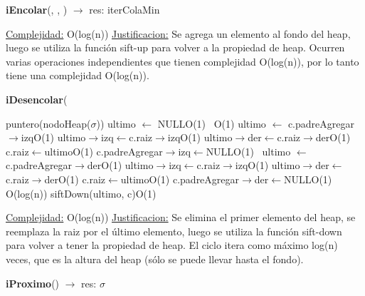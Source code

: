 \begin{Representacion}
\begin{Algoritmos}
\begin{algorithm}[H]{\textbf{iEncolar}(, , ) $\to$ res: iterColaMin}
\begin{algorithmic}[1]
		
		\medskip
		\Statex \underline{Complejidad:} O(log(n))
			\Statex \underline{Justificacion:} Se agrega un elemento al fondo del heap, luego se utiliza la función sift-up para volver a la propiedad de heap. Ocurren varias operaciones independientes que tienen complejidad O(log(n)), por lo tanto tiene una complejidad O(log(n)).
	\end{algorithmic}
\end{algorithm}



\begin{algorithm}[H]{\textbf{iDesencolar}(}
	\begin{algorithmic}[1]

		\State puntero(nodoHeap($\sigma$)) ultimo $\leftarrow$ NULL\Comment O(1)
		\,
		\Comment O(1)
			\State ultimo $\leftarrow$ c.padreAgregar$\rightarrow$izq\Comment O(1)
			\State ultimo$\rightarrow$izq$\leftarrow$c.raiz$\rightarrow$izq\Comment O(1)
			\State ultimo$\rightarrow$der$\leftarrow$c.raiz$\rightarrow$der\Comment O(1)
			\State c.raiz$\leftarrow$ultimo\Comment O(1)
			\State c.padreAgregar$\rightarrow$izq$\leftarrow$NULL\Comment O(1)
			\,
		\Else
			\State ultimo $\leftarrow$ c.padreAgregar$\rightarrow$der\Comment O(1)
			\State ultimo$\rightarrow$izq$\leftarrow$c.raiz$\rightarrow$izq\Comment O(1)
			\State ultimo$\rightarrow$der$\leftarrow$c.raiz$\rightarrow$der\Comment O(1)
			\State c.raiz$\leftarrow$ultimo\Comment O(1)
			\State c.padreAgregar$\rightarrow$der$\leftarrow$NULL\Comment O(1)
		\EndIf
		\,
		 \Comment O(log(n))
			\State siftDown(ultimo, c)\Comment O(1)
		\EndWhile
		
		\medskip
		\Statex \underline{Complejidad:} O(log(n))
			\Statex \underline{Justificacion:} Se elimina el primer elemento del heap, se reemplaza la raiz por el último elemento, luego se utiliza la función sift-down para volver a tener la propiedad de heap. El ciclo itera como máximo log(n) veces, que es la altura del heap (sólo se puede llevar hasta el fondo).  
	\end{algorithmic}
\end{algorithm}


\begin{algorithm}[H]{\textbf{iProximo}() $\to$ res: $\sigma$}
	\begin{algorithmic}[1]
		

\end{algorithmic}
\end{algorithm}
\end{Algoritmos}
\end{Representacion}
